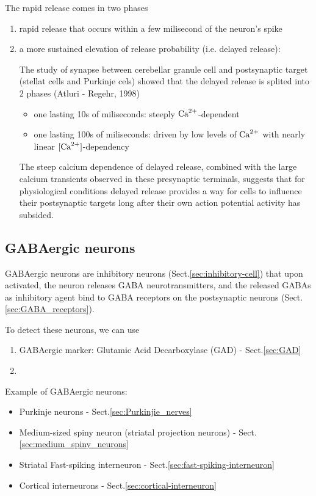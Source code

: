 The rapid release comes in two phases
\begin{enumerate}
  \item rapid release that occurs within a few milisecond of the neuron's spike
  \item a more sustained elevation of release probability (i.e. delayed
  release):

The study of synapse between cerebellar granule cell and postsynaptic target
(stellat cells and Purkinje cels) showed that the delayed release is splited
into 2 phases \citep{atluri1998} (Atluri - Regehr, 1998)
\begin{itemize}
  \item one lasting 10s of miliseconds: steeply ${\text{Ca}^{2+}}$-dependent
  \item one lasting 100s of miliseconds: driven by low levels of ${\text{Ca}^{2+}}$ with
  nearly linear $[{\text{Ca}^{2+}}]$-dependency
\end{itemize}

The steep calcium dependence of delayed release, combined with the large calcium
transients observed in these presynaptic terminals, suggests that for
physiological conditions delayed release provides a way for cells to influence
their postsynaptic targets long after their own action potential activity has
subsided.


\end{enumerate}

\subsection{GABAergic neurons}
\label{sec:GABAergic-neurons}

GABAergic neurons are inhibitory neurons (Sect.\ref{sec:inhibitory-cell}) that
upon activated, the neuron releases GABA neurotransmitters, and the released
GABAs as inhibitory agent bind to GABA receptors on the postsynaptic neurons
(Sect.\ref{sec:GABA_receptors}).

To detect these neurons, we can use
\begin{enumerate}
  \item GABAergic marker: Glutamic Acid Decarboxylase (GAD) - Sect.\ref{sec:GAD}
  
  \item 
\end{enumerate}

Example of GABAergic neurons:
\begin{itemize}
  \item Purkinje neurons - Sect.\ref{sec:Purkinjie_nerves}

  \item Medium-sized spiny neuron (striatal projection neurons) -
  Sect.\ref{sec:medium_spiny_neurons}

  \item Striatal Fast-spiking interneuron -
  Sect.\ref{sec:fast-spiking-interneuron}

  \item Cortical interneurons - Sect.\ref{sec:cortical-interneuron}
  

\end{itemize}







